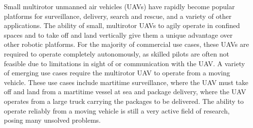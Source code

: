
Small multirotor unmanned air vehicles (UAVs) have rapidly become popular platforms for
surveillance, delivery, search and rescue, and a variety of other applications.
The ability of small, multirotor UAVs to agily operate in confined spaces and to
take off and land vertically give them a unique advantage over other robotic
platforms. For the majority of commercial use cases, these UAVs are required to operate
completely autonomously, as skilled pilots are often not feasible due to
limitations in sight of or communication with the UAV. 
A variety of emerging use cases
require the multirotor UAV to operate from a moving vehicle. These use
cases include martitime surveillance, where the UAV must take off and land from
a martitime vessel at sea
and package delivery, where the UAV operates from a large truck
carrying the packages to be delivered. The ability to operate reliably from a
moving vehicle is still a very active field of research, posing many unsolved
problems.




